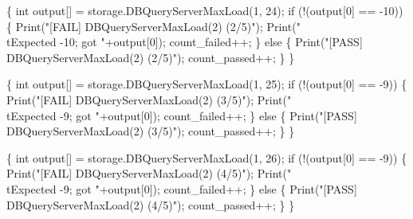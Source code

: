 \documentclass{article}
\def\nwendcode{\endtrivlist \endgroup}
\let\nwdocspar=\par
\begin{document}
\{
  int output[] = storage.DBQueryServerMaxLoad(1, 24);
  if (!(output[0] == -10)) \{
    Print("[FAIL] DBQueryServerMaxLoad(2) (2/5)");
    Print("\\tExpected -10; got "+output[0]);
    count_failed++;
  \} else \{
    Print("[PASS] DBQueryServerMaxLoad(2) (2/5)");
    count_passed++;
  \}
\}
\nwendcode{}\nwdocspar
\nwenddocs{}\endmoddef{}
\{
  int output[] = storage.DBQueryServerMaxLoad(1, 25);
  if (!(output[0] == -9)) \{
    Print("[FAIL] DBQueryServerMaxLoad(2) (3/5)");
    Print("\\tExpected -9; got "+output[0]);
    count_failed++;
  \} else \{
    Print("[PASS] DBQueryServerMaxLoad(2) (3/5)");
    count_passed++;
  \}
\}
\nwendcode{}\nwdocspar
\nwenddocs{}\endmoddef{}
\{
  int output[] = storage.DBQueryServerMaxLoad(1, 26);
  if (!(output[0] == -9)) \{
    Print("[FAIL] DBQueryServerMaxLoad(2) (4/5)");
    Print("\\tExpected -9; got "+output[0]);
    count_failed++;
  \} else \{
    Print("[PASS] DBQueryServerMaxLoad(2) (4/5)");
    count_passed++;
  \}
\}
\nwendcode{}\nwdocspar
\end{document}
